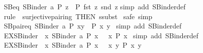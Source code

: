 \begin{isabellebody}
%
\isadelimproof
\isanewline
%
\endisadelimproof
\isanewline
{}\isamarkupfalse%
\ SB{\isacharunderscore}eq{\isacharcolon}\ {\isachardoublequoteopen}SBinder\ a\ P\ z\ {\isacharequal}\ {\isacharparenleft}P\ {\isacharparenleft}fst\ z{\isacharparenright}\ {\isacharparenleft}snd\ z{\isacharparenright}{\isacharparenright}{\isachardoublequoteclose}\isanewline
%
\isadelimproof
%
\endisadelimproof
%
\isatagproof
{}\isamarkupfalse%
{\isacharparenleft}simp\ add{\isacharcolon}\ SBinder{\isacharunderscore}def{\isacharparenright}\isanewline
{}\isamarkupfalse%
\ {\isacharparenleft}rule\ \ surjective{\isacharunderscore}pairing\ {\isacharbrackleft}THEN\ ssubst{\isacharbrackright}{\isacharparenright}\isanewline
{}\isamarkupfalse%
\ {\isacharparenleft}safe{\isacharplus}{\isacharcomma}\ simp{\isacharparenright}\isanewline
{}\isamarkupfalse%
%
\endisatagproof
{\isafoldproof}%
%
\isadelimproof
\isanewline
%
\endisadelimproof
\isanewline
{}\isamarkupfalse%
\ SB{\isacharunderscore}pair{\isacharunderscore}eq{\isacharcolon}\ {\isachardoublequoteopen}SBinder\ a\ P\ {\isacharparenleft}x{\isacharcomma}y{\isacharparenright}\ {\isacharequal}\ {\isacharparenleft}P\ x\ y{\isacharparenright}{\isachardoublequoteclose}\isanewline
%
\isadelimproof
%
\endisadelimproof
%
\isatagproof
{}\isamarkupfalse%
\ {\isacharparenleft}simp\ add{\isacharcolon}\ SBinder{\isacharunderscore}def{\isacharparenright}%
\endisatagproof
{\isafoldproof}%
%
\isadelimproof
\isanewline
%
\endisadelimproof
\isanewline
{}\isamarkupfalse%
\ EX{\isacharunderscore}SBinder{}{\isacharcolon}\ {\isachardoublequoteopen}{\isacharparenleft}{\isasymexists}\ x{\isachardot}\ {\isacharparenleft}SBinder{}\ a\ P{\isacharparenright}\ x{\isacharparenright}\ {\isacharequal}\ {\isacharparenleft}{\isasymexists}\ x{\isachardot}\ P\ x{\isacharparenright}{\isachardoublequoteclose}\isanewline
%
\isadelimproof
%
\endisadelimproof
%
\isatagproof
{}\isamarkupfalse%
\ {\isacharparenleft}simp\ add{\isacharcolon}\ SBinder{}{\isacharunderscore}def{\isacharparenright}%
\endisatagproof
{\isafoldproof}%
%
\isadelimproof
\isanewline
%
\endisadelimproof
\isanewline
{}\isamarkupfalse%
\ EX{\isacharunderscore}SBinder{\isacharcolon}\ {\isachardoublequoteopen}{\isacharparenleft}{\isasymexists}\ x{\isachardot}\ {\isacharparenleft}SBinder\ a\ P{\isacharparenright}\ x{\isacharparenright}\ {\isacharequal}\ {\isacharparenleft}{\isasymexists}\ x\ y{\isachardot}\ P\ x\ y{\isacharparenright}{\isachardoublequoteclose}\isanewline

\end{isabellebody}
